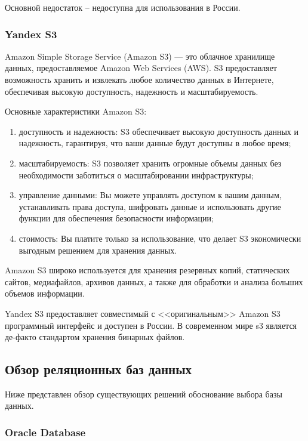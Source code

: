 Основной недостаток -- недоступна для использования в России.


\subsubsection{Yandex S3}

Amazon Simple Storage Service (Amazon S3) --- это облачное хранилище данных, предоставляемое Amazon Web Services (AWS). S3 предоставляет возможность хранить и извлекать любое количество данных в Интернете, обеспечивая высокую доступность, надежность и масштабируемость.

Основные характеристики Amazon S3:

\begin{enumerate}
	
	\item доступность и надежность: S3 обеспечивает высокую доступность данных и надежность, гарантируя, что ваши данные будут доступны в любое время;
	
	\item масштабируемость: S3 позволяет хранить огромные объемы данных без необходимости заботиться о масштабировании инфраструктуры;
	
	\item управление данными: Вы можете управлять доступом к вашим данным, устанавливать права доступа, шифровать данные и использовать другие функции для обеспечения безопасности информации;
	
	\item стоимость: Вы платите только за использование, что делает S3 экономически выгодным решением для хранения данных.
\end{enumerate}

Amazon S3 широко используется для хранения резервных копий, статических сайтов, медиафайлов, архивов данных, а также для обработки и анализа больших объемов информации.

Yandex S3 предоставляет совместимый с <<оригинальным>> Amazon S3 программный интерфейс и доступен в России. В современном мире s3 является де-факто стандартом хранения бинарных файлов.


\subsection{Обзор реляционных баз данных}

Ниже представлен обзор существующих решений обоснование выбора базы данных.

\subsubsection{Oracle Database}


